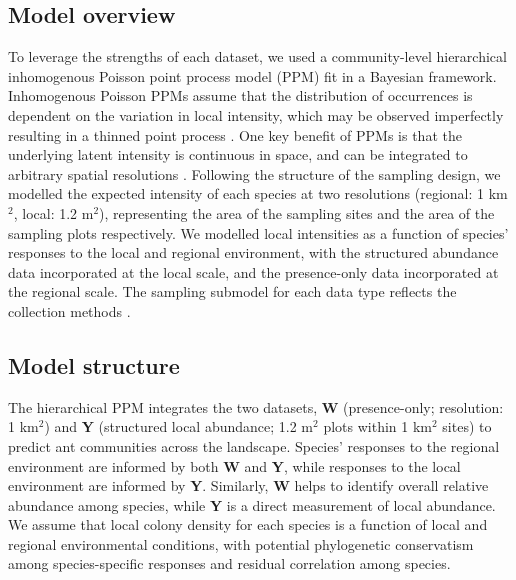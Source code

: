\documentclass[preprint,final,times,12pt,3p]{elsarticle}
\begin{document}
\subsection{Model overview}
To leverage the strengths of each dataset, we used a community-level hierarchical inhomogenous Poisson point process model (PPM) fit in a Bayesian framework. Inhomogenous Poisson PPMs assume that the distribution of occurrences is dependent on the variation in local intensity, which may be observed imperfectly resulting in a thinned point process \citep{Warton2010,Baddeley2015,Fithian2015}. One key benefit of PPMs is that the underlying latent intensity is continuous in space, and can be integrated to arbitrary spatial resolutions \citep{Renner2015,Hefley2016,Koshkina2017a,Fletcher2019}. Following the structure of the sampling design, we modelled the expected intensity of each species at two resolutions (regional: 1 km$^2$, local: 1.2 m$^2$), representing the area of the sampling sites and the area of the sampling plots respectively. We modelled local intensities as a function of species' responses to the local and regional environment, with the structured abundance data incorporated at the local scale, and the presence-only data incorporated at the regional scale. The sampling submodel for each data type reflects the collection methods \citep{Isaac2014,Hefley2016,Fletcher2019,Miller2019}.


\subsection{Model structure}
The hierarchical PPM integrates the two datasets, \textbf{W} (presence-only; resolution: 1 km$^2$) and \textbf{Y} (structured local abundance; 1.2 m$^2$ plots within 1 km$^2$ sites) to predict ant communities across the landscape. Species' responses to the regional environment are informed by both \textbf{W} and \textbf{Y}, while responses to the local environment are informed by \textbf{Y}. Similarly, \textbf{W} helps to identify overall relative abundance among species, while \textbf{Y} is a direct measurement of local abundance. We assume that local colony density for each species is a function of local and regional environmental conditions, with potential phylogenetic conservatism among species-specific responses and residual correlation among species.
\end{document}

